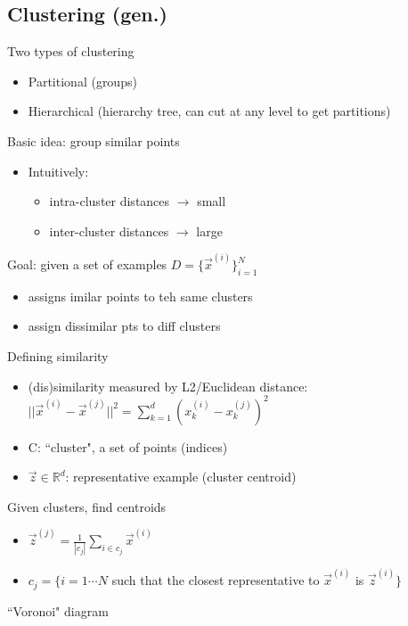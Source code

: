 \documentclass[10pt, oneside]{article}
\newcommand{\R}{\mathbb{R}}
\begin{document}
\subsection{Clustering (gen.)}
Two types of clustering
\begin{itemize}
    \item Partitional (groups)
    \item Hierarchical (hierarchy tree, can cut at any level to get partitions)
\end{itemize}
Basic idea: group similar points
\begin{itemize}
    \item Intuitively:
    \begin{itemize}
        \item intra-cluster distances $\rightarrow$ small
        \item inter-cluster distances $\rightarrow$ large
    \end{itemize}
\end{itemize}
Goal: given a set of examples $D=\{\vec x^{(i)}\}_{i=1}^N$
\begin{itemize}
    \item assigns imilar points to teh same clusters
    \item assign dissimilar pts to diff clusters
\end{itemize}
Defining similarity
\begin{itemize}
    \item (dis)similarity measured by L2/Euclidean distance: $||\vec x^{(i)} - \vec x^{(j)}||^2 =\sum_{k=1}^d \left(x_k^{(i)} - x_k^{(j)}\right)^2$
    \item C: ``cluster", a set of points (indices)
    \item $\vec z \in \R^d$: representative example (cluster centroid)
\end{itemize}
Given clusters, find centroids
\begin{itemize}
    \item $\vec z^{(j)} = \frac{1}{|c_j|} \sum_{i\in c_j} \vec x^{(i)}$
    \item $c_j = \{i=1\cdots N$ such that the closest representative to $\vec x^{(i)}$ is $\vec z^{(i)}\}$
\end{itemize}
``Voronoi" diagram
\end{document}
